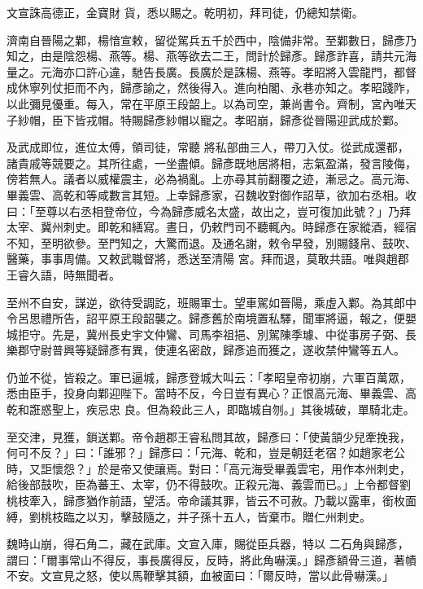 \begin{pinyinscope}
 文宣誅高德正，金寶財
 貨，悉以賜之。乾明初，拜司徒，仍總知禁衛。



 濟南自晉陽之鄴，楊愔宣敕，留從駕兵五千於西中，陰備非常。至鄴數日，歸彥乃知之，由是陰怨楊、燕等。楊、燕等欲去二王，問計於歸彥。歸彥詐喜，請共元海量之。元海亦口許心違，馳告長廣。長廣於是誅楊、燕等。孝昭將入雲龍門，都督成休寧列仗拒而不內，歸彥諭之，然後得入。進向柏閣、永巷亦知之。孝昭踐阼，以此彌見優重。每入，常在平原王段韶上。以為司空，兼尚書令。齊制，宮內唯天子紗帽，臣下皆戎帽。特賜歸彥紗帽以寵之。孝昭崩，歸彥從晉陽迎武成於鄴。



 及武成即位，進位太傅，領司徒，常聽
 將私部曲三人，帶刀入仗。從武成還都，諸貴戚等競要之。其所往處，一坐盡傾。歸彥既地居將相，志氣盈滿，發言陵侮，傍若無人。議者以威權震主，必為禍亂。上亦尋其前翻覆之迹，漸忌之。高元海、畢義雲、高乾和等咸數言其短。上幸歸彥家，召魏收對御作詔草，欲加右丞相。收曰：「至尊以右丞相登帝位，今為歸彥威名太盛，故出之，豈可復加此號？」乃拜太宰、冀州刺史。即乾和繕寫。晝日，仍敕門司不聽輒內。時歸彥在家縱酒，經宿不知，至明欲參。至門知之，大驚而退。及通名謝，敕令早發，別賜錢帛、鼓吹、醫藥，事事周備。又敕武職督將，悉送至清陽
 宮。拜而退，莫敢共語。唯與趙郡王睿久語，時無聞者。



 至州不自安，謀逆，欲待受調訖，班賜軍士。望車駕如晉陽，乘虛入鄴。為其郎中令呂思禮所告，詔平原王段韶襲之。歸彥舊於南境置私驛，聞軍將逼，報之，便嬰城拒守。先是，冀州長史宇文仲鸞、司馬李祖挹、別駕陳季璩、中從事房子弼、長樂郡守尉普興等疑歸彥有異，使連名密啟，歸彥追而獲之，遂收禁仲鸞等五人。



 仍並不從，皆殺之。軍已逼城，歸彥登城大叫云：「孝昭皇帝初崩，六軍百萬眾，悉由臣手，投身向鄴迎陛下。當時不反，今日豈有異心？正恨高元海、畢義雲、高乾和誑惑聖上，疾忌忠
 良。但為殺此三人，即臨城自刎。」其後城破，單騎北走。



 至交津，見獲，鎖送鄴。帝令趙郡王睿私問其故，歸彥曰：「使黃頷少兒牽挽我，何可不反？」曰：「誰邪？」歸彥曰：「元海、乾和，豈是朝廷老宿？如趙家老公時，又詎懷怨？」於是帝又使讓焉。對曰：「高元海受畢義雲宅，用作本州刺史，給後部鼓吹，臣為蕃王、太宰，仍不得鼓吹。正殺元海、義雲而已。」上令都督劉桃枝牽入，歸彥猶作前語，望活。帝命議其罪，皆云不可赦。乃載以露車，銜枚面縛，劉桃枝臨之以刃，擊鼓隨之，并子孫十五人，皆棄市。贈仁州刺史。



 魏時山崩，得石角二，藏在武庫。文宣入庫，賜從臣兵器，特以
 二石角與歸彥，謂曰：「爾事常山不得反，事長廣得反，反時，將此角嚇漢。」歸彥額骨三道，著幘不安。文宣見之怒，使以馬鞭擊其額，血被面曰：「爾反時，當以此骨嚇漢。」




\end{pinyinscope}
